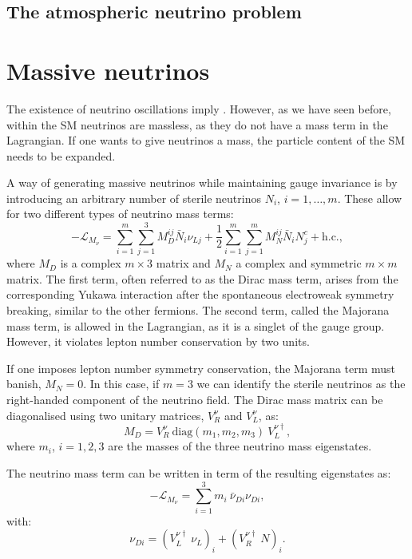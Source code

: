 \subsection{The atmospheric neutrino problem}

\section{Massive neutrinos}

The existence of neutrino oscillations imply . However, as we have seen before, within the SM neutrinos are massless, as they do not have a mass term in the Lagrangian. If one wants to give neutrinos a mass, the particle content of the SM needs to be expanded.

A way of generating massive neutrinos while maintaining gauge invariance is by introducing an arbitrary number of sterile neutrinos $N_{i}$, $i=1,\dots,m$. These allow for two different types of neutrino mass terms:
\begin{equation}\label{2.10}
	-\mathcal{L}_{M_{\nu}} = \sum_{i=1}^{m} \sum_{j=1}^{3} M^{ij}_{D} \bar{N}_{i} \nu_{Lj} + \frac{1}{2} \sum_{i=1}^{m} \sum_{j=1}^{m} M^{ij}_{N} \bar{N}_{i} N^{c}_{j} + \mathrm{h.c.},
\end{equation}
where $M_{D}$ is a complex $m \times 3$ matrix and $M_{N}$ a complex and symmetric $m \times m$ matrix. The first term, often referred to as the Dirac mass term, arises from the corresponding Yukawa interaction after the spontaneous electroweak symmetry breaking, similar to the other fermions. The second term, called the Majorana mass term, is allowed in the Lagrangian, as it is a singlet of the gauge group. However, it violates lepton number conservation by two units.

If one imposes lepton number symmetry conservation, the Majorana term must banish, $M_{N}=0$. In this case, if $m=3$ we can identify the sterile neutrinos as the right-handed component of the neutrino field. The Dirac mass matrix can be diagonalised using two unitary matrices, $V^{\nu}_{R}$ and $V^{\nu}_{L}$, as:
\begin{equation}
	M_{D} = V^{\nu}_{R}~\mathrm{diag}(m_{1}, m_{2}, m_{3})~V^{\nu \dagger}_{L},
\end{equation}
where $m_{i}$, $i=1,2,3$ are the masses of the three neutrino mass eigenstates.

The neutrino mass term can be written in term of the resulting eigenstates as:
\begin{equation}
	-\mathcal{L}_{M_{\nu}} = \sum_{i=1}^{3} m_{i}~\bar{\nu}_{Di} \nu_{Di},
\end{equation}
with:
\begin{equation}
	\nu_{Di} = \left(V^{\nu \dagger}_{L}~\nu_{L}\right)_{i} + \left(V^{\nu \dagger}_{R}~N\right)_{i}.
\end{equation}

